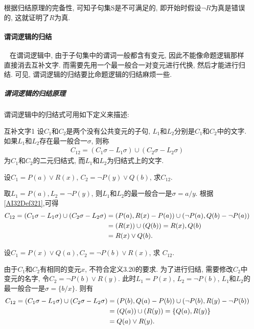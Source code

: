 根据归结原理的完备性, 可知子句集S是不可满足的, 即开始时假设$\neg R$为真是错误的, 这就证明了$R$为真.

\paragraph{谓词逻辑的归结}~{}
在谓词逻辑中, 由于子句集中的谓词一般都含有变元, 因此不能像命题逻辑那样直接消去互补文字. 而需要先用一个最一般合一对变元进行代换, 然后才能进行归结. 可见, 谓词逻辑的归结要比命题逻辑的归结麻烦一些.
\subparagraph{谓词逻辑的归结原理}
谓词逻辑中的归结式可用如下定义来描述:
\begin{mydef}{互补文字}{1}\label{AI32Def321}
设$C_1$和$C_2$是两个没有公共变元的子句, $L_1$和$L_2$分别是$C_1$和$C_2$中的文字. 如果$L_1$和$L_2$存在最一般合一$\sigma$, 则称
\begin{align}
  C_{12}=({C_1\sigma }-{ L_1\sigma })\cup ({ C_2\sigma }-{ L_2\sigma })
\end{align}
为$C_1$和$C_2$的二元归结式, 而$L_1$和$L_2$为归结式上的文字.
\end{mydef}
\begin{example}
  设$C_1=P(a)\vee R(x)$, $C_2=\neg P(y)\vee Q(b)$, 求$C_{12}$.
\end{example}
\begin{result}
取$L_1= P(a),  L_2=\neg P(y)$, 则$L_1$和$L_2$的最一般合一是$\sigma={a/y}$. 根据\ref{AI32Def321},可得
\begin{align}
C_{12}=( {C_1\sigma }-{L_1\sigma }) \cup  ({C_2 \sigma }-{L_2\sigma })
              &=({P(a), R(x)}-{P(a)})\cup ({\neg P(a), Q(b)}-{\neg P(a)})\notag\\
              &=({R(x)})\cup({Q(b)})= {R(x), Q(b)}\notag\\
              &=R(x)\vee Q(b).
\end{align}
\end{result}
\begin{example}
   设$C_1=P(x)\vee Q(a), C_2=\neg P(b)\vee R(x)$, 求 $C_{12}$.
\end{example}
\begin{result}
由于$C_1$和$C_2$有相同的变元$x$, 不符合定义3.20的要求. 为了进行归结, 需要修改$C_2$中变元的名字, 令$C_2=\neg P(b)\vee R(y)$.
此时$L_1= P(x)$, $L_2 =\neg P(b)$, $L_1$和$L_2$的最一般合一是$\sigma =\{b/x\}$. 则有
\begin{align}
C_{12}=( {C_1\sigma }-{L_1\sigma })\cup  ({C_2\sigma }-{L_2\sigma })
            &=({P(b), Q(a)}-{P(b)}) \cup  ({\neg P(b), R(y)}-{\neg P(b)})\notag\\
            &=({Q(a)}) \cup  ({R(y)})= \{Q(a), R(y)\}\notag\\
            &=Q(a)\vee R(y).
\end{align}
\end{result}

